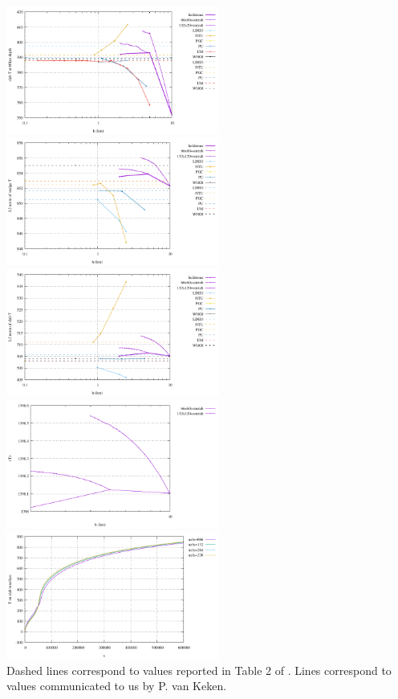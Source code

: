 \begin{center}
\includegraphics[width=7cm]{python_codes/fieldstone_68/results/case1c/Tcorner}
\includegraphics[width=7cm]{python_codes/fieldstone_68/results/case1c/Twedge}\\
\includegraphics[width=7cm]{python_codes/fieldstone_68/results/case1c/Tslab}
\includegraphics[width=7cm]{python_codes/fieldstone_68/results/case1c/Tavrg}\\
\includegraphics[width=7cm]{python_codes/fieldstone_68/results/case1c/tempdiag}\\
{\captionfont Dashed lines correspond to values reported in Table 2 of \cite{vack08}.
Lines correspond to values communicated to us by P. van Keken.}
\end{center}

